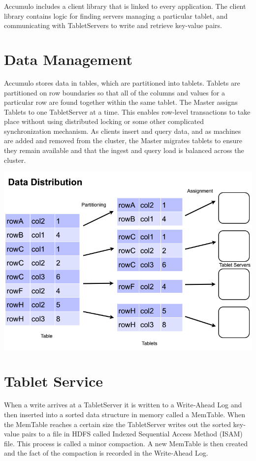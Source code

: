 Accumulo includes a client library that is linked to every application. The client
library contains logic for finding servers managing a particular tablet, and
communicating with TabletServers to write and retrieve key-value pairs.

\section{Data Management}

Accumulo stores data in tables, which are partitioned into tablets. Tablets are
partitioned on row boundaries so that all of the columns and values for a particular
row are found together within the same tablet. The Master assigns Tablets to one
TabletServer at a time. This enables row-level transactions to take place without
using distributed locking or some other complicated synchronization mechanism. As
clients insert and query data, and as machines are added and removed from the
cluster, the Master migrates tablets to ensure they remain available and that the
ingest and query load is balanced across the cluster.

\begin{center}
\includegraphics[scale=0.4]{images/data_distribution.png}
\end{center}

\section{Tablet Service}


When a write arrives at a TabletServer it is written to a Write‐Ahead Log and
then inserted into a sorted data structure in memory called a MemTable. When the
MemTable reaches a certain size the TabletServer writes out the sorted key-value
pairs to a file in HDFS called Indexed Sequential Access Method (ISAM)
file. This process is called a minor compaction.  A new MemTable is then created
and the fact of the compaction is recorded in the Write‐Ahead Log.


